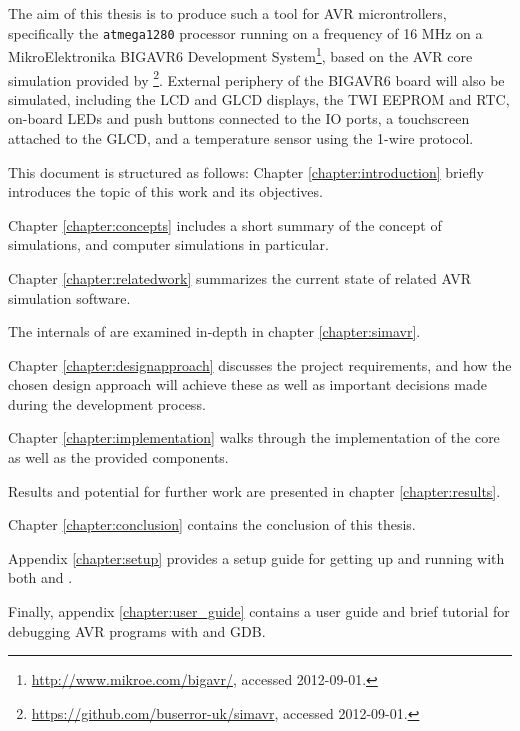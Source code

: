 The aim of this thesis is to produce such a tool for \ac{AVR} microntrollers,
specifically the \verb|atmega1280| processor running on a frequency of 16 \ac{MHz}
on a MikroElektronika BIGAVR6 Development System\footnote{
%
\url{http://www.mikroe.com/bigavr/}, accessed 2012-09-01.
%
}, based on the \ac{AVR} core simulation provided by \simavr\footnote{
%
\url{https://github.com/buserror-uk/simavr}, accessed 2012-09-01.
%
}. External periphery of the BIGAVR6 board will also be simulated, including
the \ac{LCD} and \ac{GLCD} displays, the \ac{TWI} \ac{EEPROM} and \ac{RTC},
on-board \acp{LED} and push buttons connected to the \ac{IO} ports, a touchscreen
attached to the \ac{GLCD}, and a temperature sensor using the 1-wire protocol.

This document is structured as follows: Chapter \ref{chapter:introduction} briefly
introduces the topic of this work and its objectives.

Chapter \ref{chapter:concepts} includes a short summary of the concept of simulations,
and computer simulations in particular.

Chapter \ref{chapter:relatedwork} summarizes the current state of related \ac{AVR}
simulation software.

The internals of \simavr are examined in-depth in chapter \ref{chapter:simavr}.

Chapter \ref{chapter:designapproach} discusses the project requirements, and
how the chosen design approach will achieve these as well as important decisions
made during the development process.

Chapter \ref{chapter:implementation} walks through the implementation of the
\qsimavr core as well as the provided components.

Results and potential for further work are presented in chapter \ref{chapter:results}.

Chapter \ref{chapter:conclusion} contains the conclusion of this thesis.

Appendix \ref{chapter:setup} provides a setup guide for getting up and running
with both \simavr and \qsimavr.

Finally, appendix \ref{chapter:user_guide} contains a \qsimavr user guide
and brief tutorial for debugging \ac{AVR} programs with \qsimavr and \ac{GDB}.
